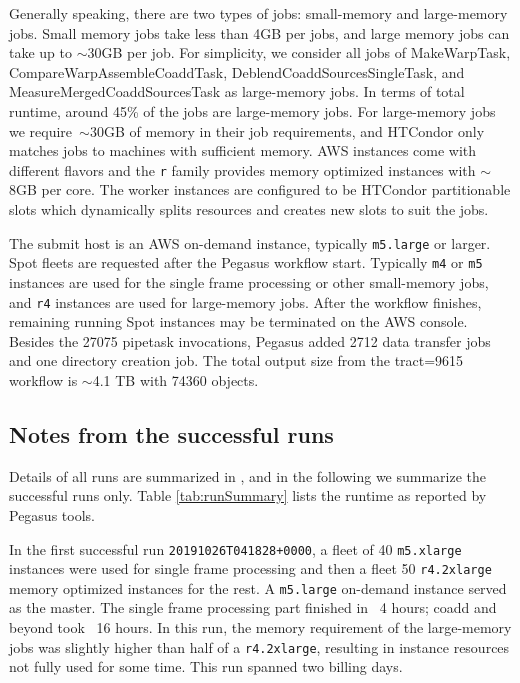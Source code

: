 

Generally speaking, there are two types of jobs: small-memory and large-memory jobs.
Small memory jobs take less than 4GB per jobs, and large memory jobs can take up to $\sim$30GB per job.
For simplicity, we consider all jobs of MakeWarpTask, CompareWarpAssembleCoaddTask, DeblendCoaddSourcesSingleTask, and MeasureMergedCoaddSourcesTask as large-memory jobs.
In terms of total runtime, around 45\% of the jobs are large-memory jobs.
For large-memory jobs we require~$\sim$30GB of memory in their job requirements, and HTCondor only matches jobs to machines with sufficient memory.
AWS instances come with different flavors and the \texttt{r} family provides memory optimized instances with $\sim$8GB per core.
The worker instances are configured to be HTCondor partitionable slots which dynamically splits resources and creates new slots to suit the jobs.

The submit host is an AWS on-demand instance, typically \texttt{m5.large} or larger.
Spot fleets are requested after the Pegasus workflow start.
Typically \texttt{m4} or \texttt{m5} instances are used for the single frame processing or other small-memory jobs, and \texttt{r4} instances are used for large-memory jobs.
After the workflow finishes, remaining running Spot instances may be terminated on the AWS console.
Besides the 27075 pipetask invocations, Pegasus added 2712 data transfer jobs and one directory creation job.
The total output size from the tract=9615 workflow is $\sim$4.1 TB with 74360 objects.

\subsection{Notes from the successful runs}

Details of all runs are summarized in , and in the following we summarize the successful runs only.
Table \ref{tab:runSummary} lists the runtime as reported by Pegasus tools.



In the first successful run \texttt{20191026T041828+0000}, a fleet of 40 \texttt{m5.xlarge} instances were used for single frame processing and then a fleet 50 \texttt{r4.2xlarge} memory optimized instances for the rest.
A \texttt{m5.large} on-demand instance served as the master.
The single frame processing part finished in ~4 hours; coadd and beyond took ~16 hours.
In this run, the memory requirement of the large-memory jobs was slightly higher than half of a \texttt{r4.2xlarge}, resulting in instance resources not fully used for some time.
This run spanned two billing days.

